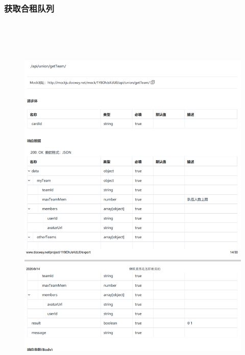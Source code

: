         \subsubsection{获取合租队列} 
                        \begin{figure}[h]
                            \centering
                            \includegraphics[height=19.0cm,width=14.0cm]{design/image/api14.png} 
                            \end{figure}  
                            \newpage                
 
